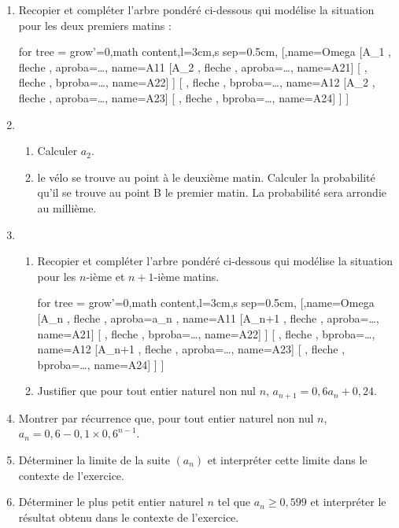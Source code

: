 \begin{enumerate}
	\item Recopier et compléter l'arbre pondéré ci-dessous qui modélise la situation pour les deux premiers matins :
	
	\begin{center}
		\begin{forest} for tree = {grow'=0,math content,l=3cm,s sep=0.5cm},
			[,name=Omega
			[A_1 , fleche , aproba=\ldots , name=A11
			[A_2 , fleche , aproba=\ldots , name=A21]
			[ , fleche , bproba=\ldots , name=A22]
			]
			[ , fleche , bproba=\ldots , name=A12
			[A_2 , fleche , aproba=\ldots , name=A23]
			[ , fleche , bproba=\ldots , name=A24]
			]
			]
		\end{forest}
	\end{center}
	\item
	\begin{enumerate}
		\item Calculer $a_2$.
		\item le vélo se trouve au point à le deuxième matin. Calculer la probabilité qu'il se trouve au point B le premier matin. La probabilité sera arrondie au millième.
	\end{enumerate}
	\item
	\begin{enumerate}
		\item Recopier et compléter l'arbre pondéré ci-dessous qui modélise la situation pour les $n$-ième et $n + 1$-ième  matins.
		
		\begin{center}
			\begin{forest} for tree = {grow'=0,math content,l=3cm,s sep=0.5cm},
				[,name=Omega
				[A_n , fleche , aproba=a_n , name=A11
				[A_{n+1} , fleche , aproba=\ldots , name=A21]
				[ , fleche , bproba=\ldots , name=A22]
				]
				[ , fleche , bproba=\ldots , name=A12
				[A_{n+1} , fleche , aproba=\ldots , name=A23]
				[ , fleche , bproba=\ldots , name=A24]
				]
				]
			\end{forest}
		\end{center}
		\item Justifier que pour tout entier naturel non nul $n$, $a_{n+1} = 0,6a_n + 0,24$.
	\end{enumerate}
	\item Montrer par récurrence que, pour tout entier naturel non nul $n$, $a_n = 0,6 - 0,1 \times 0,6^{n - 1}$.
	\item Déterminer la limite de la suite $\left(a_n\right)$ et interpréter cette limite dans le contexte de l'exercice. 
	\item Déterminer le plus petit  entier naturel $n$ tel que $a_n \geqslant  0,599$ et interpréter le résultat obtenu dans le contexte de l'exercice.
\end{enumerate}

